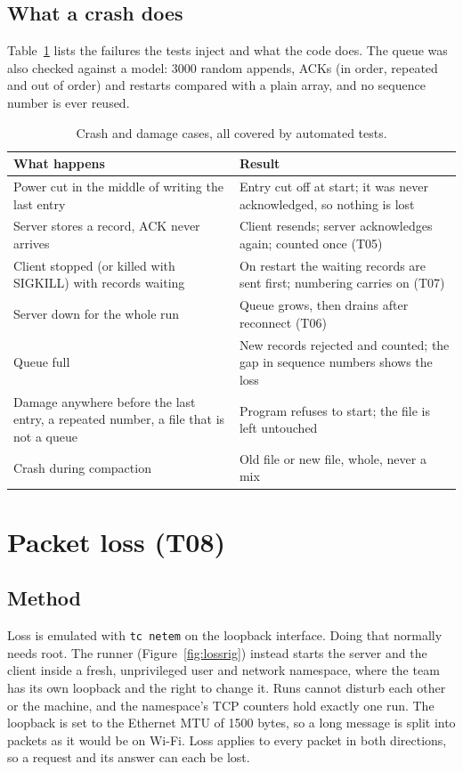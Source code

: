 \documentclass[11pt,a4paper]{article}
\newcommand{\prog}[1]{\texttt{#1}}
\begin{document}
\subsection{What a crash does}

Table~\ref{tab:crash} lists the failures the tests inject and what the code does. The queue was
also checked against a model: 3000 random appends, ACKs (in order, repeated and out of order) and
restarts compared with a plain array, and no sequence number is ever reused.

\begin{table}[!htbp]
\centering
\caption{Crash and damage cases, all covered by automated tests.}
\label{tab:crash}
\small
\begin{tabularx}{\linewidth}{@{}XX@{}}
\toprule
What happens & Result \\
\midrule
Power cut in the middle of writing the last entry & Entry cut off at start; it was never acknowledged, so nothing is lost \\
Server stores a record, ACK never arrives & Client resends; server acknowledges again; counted once (T05) \\
Client stopped (or killed with SIGKILL) with records waiting & On restart the waiting records are sent first; numbering carries on (T07) \\
Server down for the whole run & Queue grows, then drains after reconnect (T06) \\
Queue full & New records rejected and counted; the gap in sequence numbers shows the loss \\
Damage anywhere before the last entry, a repeated number, a file that is not a queue & Program refuses to start; the file is left untouched \\
Crash during compaction & Old file or new file, whole, never a mix \\
\bottomrule
\end{tabularx}
\end{table}

\FloatBarrier
\section{Packet loss (T08)}

\subsection{Method}

Loss is emulated with \prog{tc netem} on the loopback interface. Doing that normally needs root. The
runner (Figure~\ref{fig:lossrig}) instead starts the server and the client inside a fresh, unprivileged
user and network namespace, where the team has its own loopback and the right to change it. Runs
cannot disturb each other or the machine, and the namespace's TCP counters hold exactly one run. The
loopback is set to the Ethernet MTU of 1500 bytes, so a long message is split into packets as it would
be on Wi-Fi. Loss applies to every packet in both directions, so a request and its answer can each be
lost.
\end{document}
